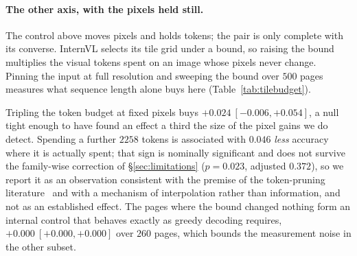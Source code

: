 \documentclass[10pt,twocolumn]{article}
\theoremstyle{plain}
\begin{document}
\paragraph{The other axis, with the pixels held still.} The control above moves
pixels and holds tokens; the pair is only complete with its converse. InternVL
selects its tile grid under a bound, so raising the bound multiplies the visual
tokens spent on an image whose pixels never change. Pinning the input at full
resolution and sweeping the bound over $500$ pages measures what sequence
length alone buys here (Table~\ref{tab:tilebudget}).

\begin{table}[t]
\centering\small
\setlength{\tabcolsep}{3.5pt}
\caption{InternVL3-1B on $500$ DocVQA pages with the input pinned at full
resolution and only the tile bound moving. Accuracy is $0.782$, $0.806$,
$0.784$ by bound. The second bound raises the token count on $48\%$ of pages
and leaves the rest untouched, so the step is reported conditioned on what was
spent rather than on the bound's name.}
\label{tab:tilebudget}
\end{table}

Tripling the token budget at fixed pixels buys
$+0.024\ [-0.006, +0.054]$, a null tight enough to have found an effect a third
the size of the pixel gains we do detect. Spending a further $2258$ tokens is
associated with $0.046$ \emph{less} accuracy where it is actually spent; that
sign is nominally significant and does not survive the family-wise correction
of \S\ref{sec:limitations} ($p = 0.023$, adjusted $0.372$), so we report it as
an observation consistent with the premise of the token-pruning
literature~\cite{glimpseprune} and with a mechanism of interpolation rather
than information, and not as an established effect. The pages where the bound
changed nothing form an internal control that behaves exactly as greedy
decoding requires, $+0.000\ [+0.000, +0.000]$ over $260$ pages, which bounds
the measurement noise in the other subset.
\end{document}
